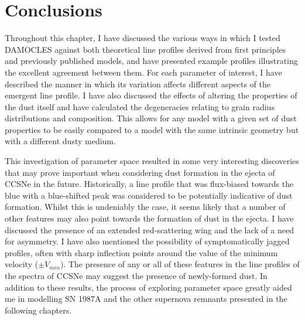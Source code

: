 \section{Conclusions}

Throughout this chapter, I have discussed the various ways in which I tested DAMOCLES against both theoretical line profiles derived from first principles and previously published models, and have presented example profiles illustrating the excellent agreement between them.  For each parameter of interest, I have described the manner in which its variation affects different aspects of the emergent line profile.  I have also discussed the effects of altering the properties of the dust itself and have calculated the degeneracies relating to grain radius distributions and composition.  This allows for any model with a given set of dust properties to be easily compared to a model with the same intrinsic geometry but with a different dusty medium.  

This investigation of parameter space resulted in some very interesting discoveries that may prove important when considering dust formation in the ejecta of CCSNe in the future.  Historically,  a line profile that was flux-biased towards the blue with a blue-shifted peak was considered to be potentially indicative of dust formation.  Whilst this is undeniably the case, it seems likely that a number of other features may also point towards the formation of dust in the ejecta.  I have discussed the presence of an extended red-scattering wing and the lack of a need for asymmetry.  I have also mentioned the possibility of symptomatically jagged profiles, often with sharp inflection points around the value of the minimum velocity ($\pm V_{min}$).  The presence of any or all of these features in the line profiles of the spectra of CCSNe may suggest the presence of newly-formed dust.  In addition to these results, the process of exploring parameter space greatly aided me in modelling SN 1987A and the other supernova remnants presented in the following chapters.





